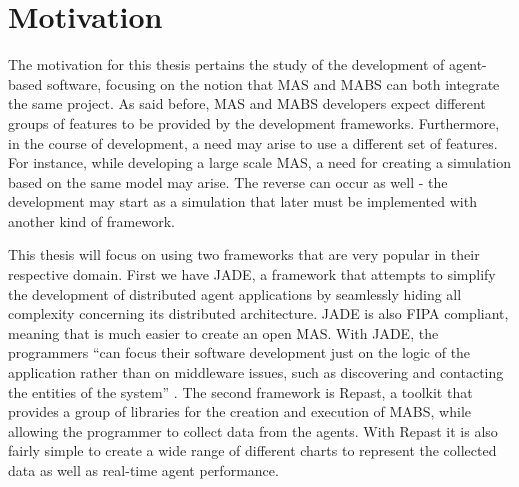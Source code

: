 \section{Motivation} \label{sec:goals}


The motivation for this thesis pertains the study of the development of agent-based software, focusing on the notion that MAS and MABS can both integrate the same project. As said before, MAS and MABS developers expect different groups of features to be provided by the development frameworks. Furthermore, in the course of development, a need may arise to use a different set of features. For instance, while developing a large scale MAS, a need for creating a simulation based on the same model may arise. The reverse can occur as well - the development may start as a simulation that later must be implemented with another kind of framework.

This thesis will focus on using two frameworks that are very popular in their respective domain. First we have JADE, a framework that attempts to simplify the development of distributed agent applications by seamlessly hiding all complexity concerning its distributed architecture. JADE is also FIPA compliant, meaning that is much easier to create an open MAS. With JADE, the programmers ``can focus their software development just on the logic of the application rather than on middleware issues, such as discovering and contacting the entities of the system'' \cite{bellifemine2003jade}. The second framework is Repast, a toolkit that provides a group of libraries for the creation and execution of MABS, while allowing the programmer to collect data from the agents. With Repast it is also fairly simple to create a wide range of different charts to represent the collected data as well as real-time agent performance.

